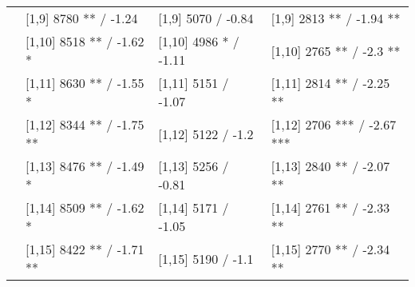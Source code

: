 \begin{table}
\begin{tabular}[t]{llll}
 & {}[1,9] 8780 ** / -1.24 & {}[1,9] 5070  / -0.84 & {}[1,9] 2813 ** / -1.94 **\\
 & {}[1,10] 8518 ** / -1.62 * & {}[1,10] 4986 * / -1.11 & {}[1,10] 2765 ** / -2.3 **\\
 & {}[1,11] 8630 ** / -1.55 * & {}[1,11] 5151  / -1.07 & {}[1,11] 2814 ** / -2.25 **\\
 & {}[1,12] 8344 ** / -1.75 ** & {}[1,12] 5122  / -1.2 & {}[1,12] 2706 *** / -2.67 ***\\
\addlinespace
 & {}[1,13] 8476 ** / -1.49 * & {}[1,13] 5256  / -0.81 & {}[1,13] 2840 ** / -2.07 **\\
 & {}[1,14] 8509 ** / -1.62 * & {}[1,14] 5171  / -1.05 & {}[1,14] 2761 ** / -2.33 **\\
 & {}[1,15] 8422 ** / -1.71 ** & {}[1,15] 5190  / -1.1 & {}[1,15] 2770 ** / -2.34 **\\
\bottomrule
\end{tabular}
\end{table}
